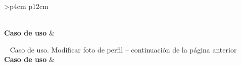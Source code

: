 \begin{longtable}{
    >{}p{4cm}
    p{12cm}
    }
    \caption{Caso de uso. Modificar foto de perfil} \label{table:cu_modificar-perfil} \\
    \toprule
    \textbf{Caso de uso} &  \\
    \endfirsthead
    
    {{ \tablename\ \thetable{} Caso de uso. Modificar foto de perfil -- continuación de la página anterior}} \\
    \toprule
    \textbf{Caso de uso} &  \\
    \midrule
    \endhead
    
    \midrule
     \\ 
    \endfoot
    
    \bottomrule
    \endlastfoot
    

\end{longtable}
